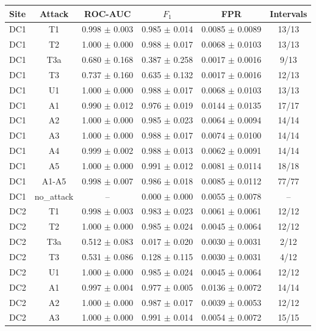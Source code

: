 \begin{tabular}{lccccc}
\hline
Site & Attack & ROC-AUC & $F_1$ & FPR & Intervals \\
\hline
DC1 & T1 & 0.998 $\pm$ 0.003 & 0.985 $\pm$ 0.014 & 0.0085 $\pm$ 0.0089 & 13/13 \\
DC1 & T2 & 1.000 $\pm$ 0.000 & 0.988 $\pm$ 0.017 & 0.0068 $\pm$ 0.0103 & 13/13 \\
DC1 & T3a & 0.680 $\pm$ 0.168 & 0.387 $\pm$ 0.258 & 0.0017 $\pm$ 0.0016 & 9/13 \\
DC1 & T3 & 0.737 $\pm$ 0.160 & 0.635 $\pm$ 0.132 & 0.0017 $\pm$ 0.0016 & 12/13 \\
DC1 & U1 & 1.000 $\pm$ 0.000 & 0.988 $\pm$ 0.017 & 0.0068 $\pm$ 0.0103 & 13/13 \\
DC1 & A1 & 0.990 $\pm$ 0.012 & 0.976 $\pm$ 0.019 & 0.0144 $\pm$ 0.0135 & 17/17 \\
DC1 & A2 & 1.000 $\pm$ 0.000 & 0.985 $\pm$ 0.023 & 0.0064 $\pm$ 0.0094 & 14/14 \\
DC1 & A3 & 1.000 $\pm$ 0.000 & 0.988 $\pm$ 0.017 & 0.0074 $\pm$ 0.0100 & 14/14 \\
DC1 & A4 & 0.999 $\pm$ 0.002 & 0.988 $\pm$ 0.013 & 0.0062 $\pm$ 0.0091 & 14/14 \\
DC1 & A5 & 1.000 $\pm$ 0.000 & 0.991 $\pm$ 0.012 & 0.0081 $\pm$ 0.0114 & 18/18 \\
DC1 & A1-A5 & 0.998 $\pm$ 0.007 & 0.986 $\pm$ 0.018 & 0.0085 $\pm$ 0.0112 & 77/77 \\
DC1 & no\_attack & -- & 0.000 $\pm$ 0.000 & 0.0055 $\pm$ 0.0078 & -- \\
DC2 & T1 & 0.998 $\pm$ 0.003 & 0.983 $\pm$ 0.023 & 0.0061 $\pm$ 0.0061 & 12/12 \\
DC2 & T2 & 1.000 $\pm$ 0.000 & 0.985 $\pm$ 0.024 & 0.0045 $\pm$ 0.0064 & 12/12 \\
DC2 & T3a & 0.512 $\pm$ 0.083 & 0.017 $\pm$ 0.020 & 0.0030 $\pm$ 0.0031 & 2/12 \\
DC2 & T3 & 0.531 $\pm$ 0.086 & 0.128 $\pm$ 0.115 & 0.0030 $\pm$ 0.0031 & 4/12 \\
DC2 & U1 & 1.000 $\pm$ 0.000 & 0.985 $\pm$ 0.024 & 0.0045 $\pm$ 0.0064 & 12/12 \\
DC2 & A1 & 0.997 $\pm$ 0.004 & 0.977 $\pm$ 0.005 & 0.0136 $\pm$ 0.0072 & 14/14 \\
DC2 & A2 & 1.000 $\pm$ 0.000 & 0.987 $\pm$ 0.017 & 0.0039 $\pm$ 0.0053 & 12/12 \\
DC2 & A3 & 1.000 $\pm$ 0.000 & 0.991 $\pm$ 0.014 & 0.0054 $\pm$ 0.0072 & 15/15 \\

\end{tabular}
